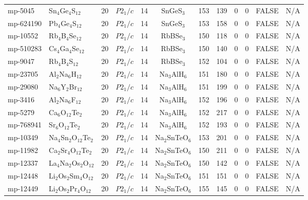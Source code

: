{\begin{longtable}{llcccccccccc}
    mp-5045 & Sn$_{4}$Ge$_{4}$S$_{12}$ & 20    & $P2_1/c$ & 14    & SnGeS$_{3}$ & 153   & 139   & 0     & 0     & FALSE & N/A \\
    mp-624190 & Pb$_{4}$Ge$_{4}$S$_{12}$ & 20    & $P2_1/c$ & 14    & SnGeS$_{3}$ & 153   & 158   & 0     & 0     & FALSE & N/A \\
    mp-10552 & Rb$_{4}$B$_{4}$Se$_{12}$ & 20    & $P2_1/c$ & 14    & RbBSe$_{3}$ & 150   & 118   & 0     & 0     & FALSE & N/A \\
    mp-510283 & Cs$_{4}$Ga$_{4}$Se$_{12}$ & 20    & $P2_1/c$ & 14    & RbBSe$_{3}$ & 150   & 140   & 0     & 0     & FALSE & N/A \\
    mp-9047 & Rb$_{4}$B$_{4}$S$_{12}$ & 20    & $P2_1/c$ & 14    & RbBSe$_{3}$ & 152   & 104   & 0     & 0     & FALSE & N/A \\
    mp-23705 & Al$_{2}$Na$_{6}$H$_{12}$ & 20    & $P2_1/c$ & 14    & Na$_{3}$AlH$_{6}$ & 151   & 180   & 0     & 0     & FALSE & N/A \\
    mp-29080 & Na$_{6}$Y$_{2}$Br$_{12}$ & 20    & $P2_1/c$ & 14    & Na$_{3}$AlH$_{6}$ & 151   & 199   & 0     & 0     & FALSE & N/A \\
    mp-3416 & Al$_{2}$Na$_{6}$F$_{12}$ & 20    & $P2_1/c$ & 14    & Na$_{3}$AlH$_{6}$ & 152   & 196   & 0     & 0     & FALSE & N/A \\
    mp-5279 & Ca$_{6}$O$_{12}$Te$_{2}$ & 20    & $P2_1/c$ & 14    & Na$_{3}$AlH$_{6}$ & 152   & 217   & 0     & 0     & FALSE & N/A \\
    mp-768941 & Sr$_{6}$O$_{12}$Te$_{2}$ & 20    & $P2_1/c$ & 14    & Na$_{3}$AlH$_{6}$ & 152   & 193   & 0     & 0     & FALSE & N/A \\
    mp-10349 & Na$_{4}$Sn$_{2}$O$_{12}$Te$_{2}$ & 20    & $P2_1/c$ & 14    & Na$_{2}$SnTeO$_{6}$ & 153   & 201   & 0     & 0     & FALSE & N/A \\
    mp-11982 & Ca$_{2}$Sr$_{4}$O$_{12}$Te$_{2}$ & 20    & $P2_1/c$ & 14    & Na$_{2}$SnTeO$_{6}$ & 150   & 211   & 0     & 0     & FALSE & N/A \\
    mp-12337 & La$_{4}$Na$_{2}$Os$_{2}$O$_{12}$ & 20    & $P2_1/c$ & 14    & Na$_{2}$SnTeO$_{6}$ & 150   & 142   & 0     & 0     & FALSE & N/A \\
    mp-12448 & Li$_{2}$Os$_{2}$Sm$_{4}$O$_{12}$ & 20    & $P2_1/c$ & 14    & Na$_{2}$SnTeO$_{6}$ & 151   & 151   & 0     & 0     & FALSE & N/A \\
    mp-12449 & Li$_{2}$Os$_{2}$Pr$_{4}$O$_{12}$ & 20    & $P2_1/c$ & 14    & Na$_{2}$SnTeO$_{6}$ & 155   & 145   & 0     & 0     & FALSE & N/A \\

\end{longtable}}
